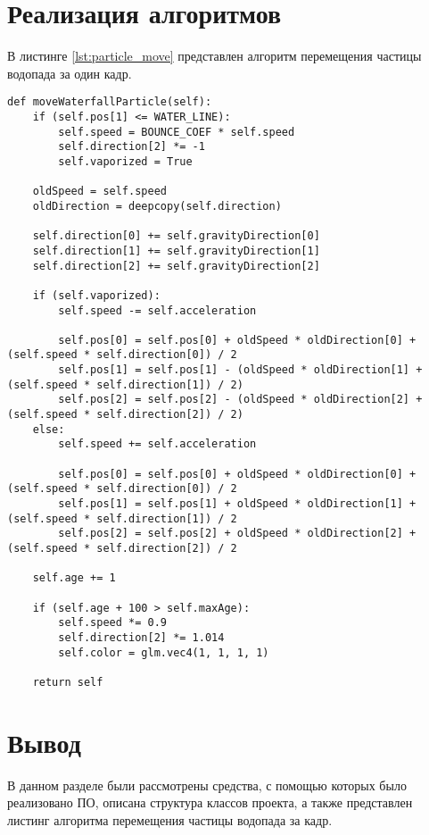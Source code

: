 \section{Реализация алгоритмов}

В листинге \ref{lst:particle_move} представлен алгоритм перемещения частицы водопада за один кадр.

\begin{center}
    \captionsetup{justification=raggedright,singlelinecheck=off}
    \begin{lstlisting}[label=lst:particle_move,caption=Алгоритм перемещения частицы водопада за один кадр]
def moveWaterfallParticle(self):
    if (self.pos[1] <= WATER_LINE):
        self.speed = BOUNCE_COEF * self.speed
        self.direction[2] *= -1
        self.vaporized = True

    oldSpeed = self.speed
    oldDirection = deepcopy(self.direction)

    self.direction[0] += self.gravityDirection[0]
    self.direction[1] += self.gravityDirection[1]
    self.direction[2] += self.gravityDirection[2]

    if (self.vaporized):
        self.speed -= self.acceleration

        self.pos[0] = self.pos[0] + oldSpeed * oldDirection[0] + (self.speed * self.direction[0]) / 2 
        self.pos[1] = self.pos[1] - (oldSpeed * oldDirection[1] + (self.speed * self.direction[1]) / 2)
        self.pos[2] = self.pos[2] - (oldSpeed * oldDirection[2] + (self.speed * self.direction[2]) / 2)
    else:
        self.speed += self.acceleration

        self.pos[0] = self.pos[0] + oldSpeed * oldDirection[0] + (self.speed * self.direction[0]) / 2
        self.pos[1] = self.pos[1] + oldSpeed * oldDirection[1] + (self.speed * self.direction[1]) / 2
        self.pos[2] = self.pos[2] + oldSpeed * oldDirection[2] + (self.speed * self.direction[2]) / 2

    self.age += 1

    if (self.age + 100 > self.maxAge):
        self.speed *= 0.9
        self.direction[2] *= 1.014
        self.color = glm.vec4(1, 1, 1, 1)

    return self
\end{lstlisting}
\end{center}


\section*{Вывод}

В данном разделе были рассмотрены средства, с помощью которых было реализовано ПО, описана структура классов проекта, а также представлен листинг алгоритма перемещения частицы водопада за кадр.
